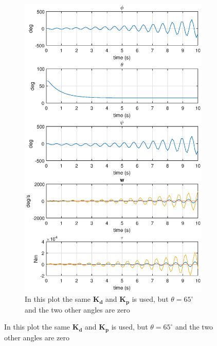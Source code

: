 \begin{figure}[ht]
	~ %
	\begin{subfigure}[b]{0.40\textwidth}
		\includegraphics[width=\textwidth]{1000euleranglesunstable}
		\caption{In this plot the same $\boldsymbol{K_d}$ and $\boldsymbol{K_p}$ is used, but $\theta=65^\circ$ and the two other angles are zero}
		\label{fig:2b}
	\end{subfigure}
\end{figure}